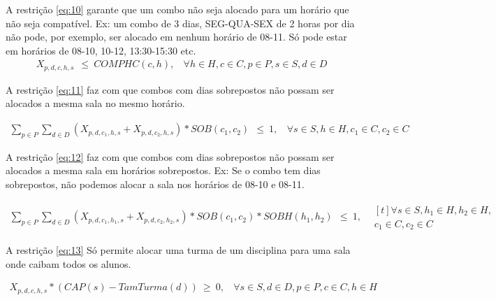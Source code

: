 A restrição \ref{eq:10} garante que um combo não seja alocado para um horário que não seja compatível. Ex: um combo de 3 dias, SEG-QUA-SEX de 2 horas por dia não pode, por exemplo, ser alocado em nenhum horário de 08-11. Só pode estar em horários de 08-10, 10-12, 13:30-15:30 etc. 
\begin{align}
	X_{p, d, c, h, s} \ \ \leq \ COMPHC(c, h), \ \ \ \ \forall h \in H, c \in C, p \in P, s \in S, d \in D \label{eq:10}
\end{align}

A restrição \ref{eq:11} faz com que combos com dias sobrepostos não possam ser alocados a mesma sala no mesmo horário.

\begin{align}
    \sum_{p \in P} \sum_{d \in D} (X_{p,d,c_1,h,s} + X_{p,d,c_2,h,s}) * SOB(c_1, c_2) \ \ \leq \ 1, \ \ \ \ \forall s \in S, h \in H, c_1 \in C, c_2 \in C \label{eq:11}
\end{align}

A restrição \ref{eq:12} faz com que combos com dias sobrepostos não possam ser alocados a mesma sala em horários sobrepostos. Ex: Se o combo tem dias sobrepostos, não podemos alocar a sala nos horários de 08-10 e 08-11.

\begin{align}
    \sum_{p \in P} \sum_{d \in D} (X_{p,d,c_1,h_1,s} + X_{p,d,c_2,h_2,s}) * SOB(c_1, c_2) * SOBH(h_1, h_2) \ \ \leq \ 1, \ \ \ \ 
    \begin{multlined}[t] \forall s \in S, h_1 \in H, h_2 \in H, \\
    c_1 \in C, c_2 \in C
    \end{multlined}\label{eq:12}
\end{align}

A restrição \ref{eq:13} Só permite alocar uma turma de um disciplina para uma sala onde caibam todos os alunos.

\begin{align}
    X_{p,d,c,h,s} * (CAP(s) - TamTurma(d)) \ \geq \ 0, \ \ \ \ \forall s \in S, d \in D, p \in P, c \in C, h \in H \label{eq:13}
\end{align}




